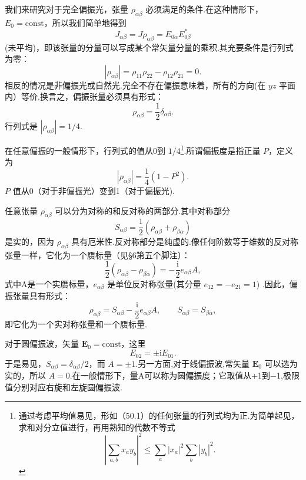 我们来研究对于完全偏振光，张量 $\rho_{\alpha\beta}$ 必须满足的条件.在这种情形下，$E_0 = \mathrm{const}$，所以我们简单地得到
\begin{equation}
  J_{\alpha\beta}=J\rho_{\alpha\beta}=E_{0\alpha}E_{0\beta}^*
\end{equation}
(未平均)，即该张量的分量可以写成某个常矢量分量的乘积.其充要条件是行列式为零：
\begin{equation}
  |\rho_{\alpha\beta}|=\rho_{11}\rho_{22}-\rho_{12}\rho_{21}=0.
\end{equation}
相反的情况是非偏振光或自然光.完全不存在偏振意味着，所有的方向(在 $yz$ 平面内）等价.换言之，偏振张量必须具有形式：
\begin{equation}
  \rho_{\alpha\beta}=\frac{1}{2}\delta_{\alpha\beta}.
\end{equation}
行列式是 $|\rho_{\alpha\beta}| = 1/4$.

在任意偏振的一般情形下，行列式的值从0到 $1/4$\footnote{通过考虑平均值易见，形如（50.1）的任何张量的行列式均为正.为简单起见，求和对分立值进行，再用熟知的代数不等式
\begin{equation*}
  \left|\sum_{a,b}x_ay_b\right|^2\leqslant\sum_a|x_a|^2\sum_b|y_b|^2.
\end{equation*}}.所谓偏振度是指正量 $P$，定义为
\begin{equation}
  |\rho_{\alpha\beta}|=\frac{1}{4}(1-P^2).
\end{equation}
$P$ 值从0（对于非偏振光）变到1（对于偏振光).

任意张量 $\rho_{\alpha\beta}$ 可以分为对称的和反对称的两部分.其中对称部分
\begin{equation*}
  S_{\alpha\beta}=\frac{1}{2}(\rho_{\alpha\beta}+\rho_{\beta\alpha})
\end{equation*}
是实的，因为 $\rho_{\alpha\beta}$ 具有厄米性.反对称部分是纯虚的.像任何阶数等于维数的反对称张量一样，它化为一个赝标量（见§6第五个脚注）：
\begin{equation*}
  \frac{1}{2}(\rho_{\alpha\beta}-\rho_{\beta\alpha})
  =-\frac{\mathrm{i}}{2}e_{\alpha\beta}A,
\end{equation*}
式中A是一个实赝标量，$e_{\alpha\beta}$ 是单位反对称张量(其分量 $e_{12} = -e_{21} = 1$) .因此，偏振张量具有形式：
\begin{equation}
  \rho_{\alpha\beta}=S_{\alpha\beta}-\frac{\mathrm{i}}{2}e_{\alpha\beta}A,
  \qquad S_{\alpha\beta}=S_{\beta\alpha},
\end{equation}
即它化为一个实对称张量和一个赝标量.

对于圆偏振波，矢量 $\boldsymbol{E}_0 = \mathrm{const}$，这里
\begin{equation*}
  E_{02}=\pm\mathrm{i}E_{01}.
\end{equation*}
于是易见，$S_{\alpha\beta} = \delta_{\alpha\beta}/2$，而 $A = \pm 1$.另一方面,对于线偏振波,常矢量 $\boldsymbol{E}_0$ 可以选为实的，所以 $A = 0$.在一般情形下，量A可以称为圆偏振度；它取值从+1到−1,极限值分别对应右旋和左旋圆偏振波.

